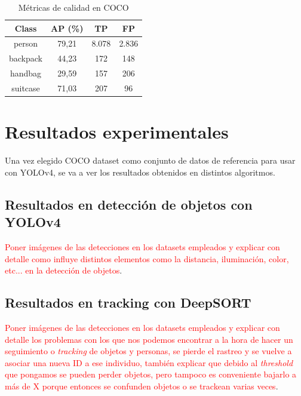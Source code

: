 \begin{table}[ht]
\centering
\caption{Métricas de calidad en COCO}
\label{tab:metricas-coco}
\begin{tabular}{|c|c|c|c|}
\hline
\rowcolor[HTML]{EFEFEF} 
\textbf{Class} & \textbf{AP (\%)} & \textbf{TP} & \textbf{FP} \\ \hline
person         & 79,21            & 8.078       & 2.836       \\ \hline
backpack       & 44,23            & 172         & 148         \\ \hline
handbag        & 29,59            & 157         & 206         \\ \hline
suitcase       & 71,03            & 207         & 96         \\ \hline
\end{tabular}
\end{table}


\section{Resultados experimentales}
\label{sec:resultados-experimentales}

Una vez elegido COCO dataset como conjunto de datos de referencia para usar con YOLOv4, se va a ver los resultados obtenidos en distintos algoritmos.

\subsection{Resultados en detección de objetos con YOLOv4}
\label{subsec:resultados-yolov4-tf}

\textcolor{red}{Poner imágenes de las detecciones en los datasets empleados y explicar con detalle como influye distintos elementos como la distancia, iluminación, color, etc... en la detección de objetos}.

\subsection{Resultados en tracking con DeepSORT}
\label{subsec:resultados-deepsort}

\textcolor{red}{Poner imágenes de las detecciones en los datasets empleados y explicar con detalle los problemas con los que nos podemos encontrar a la hora de hacer un seguimiento o \textit{tracking} de objetos y personas, se pierde el rastreo y se vuelve a asociar una nueva ID a ese individuo, también explicar que debido al \textit{threshold} que pongamos se pueden perder objetos, pero tampoco es conveniente bajarlo a más de X porque entonces se confunden objetos o se trackean varias veces}.

